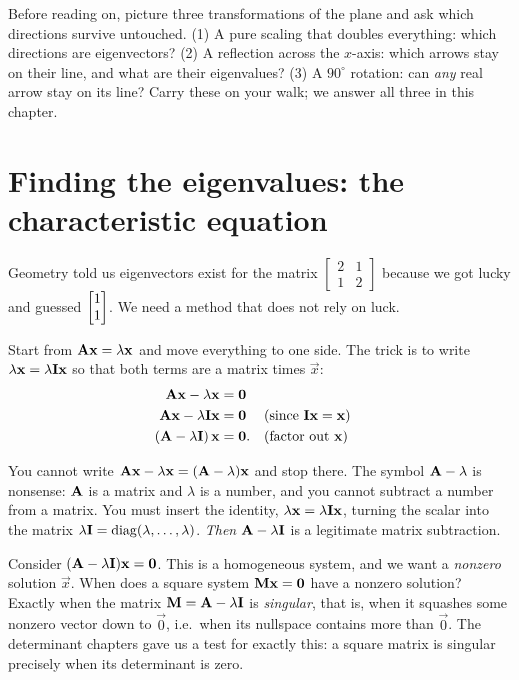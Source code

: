 \begin{walkbox}
Before reading on, picture three transformations of the plane and ask which
directions survive untouched. (1) A pure scaling that doubles everything: which
directions are eigenvectors? (2) A reflection across the $x$-axis: which arrows
stay on their line, and what are their eigenvalues? (3) A $90^\circ$ rotation:
can \emph{any} real arrow stay on its line? Carry these on your walk; we answer
all three in this chapter.
\end{walkbox}

\section{Finding the eigenvalues: the characteristic equation}
\label{ch23:char}

Geometry told us eigenvectors exist for the matrix $\begin{bmatrix}2&1\\1&2\end{bmatrix}$
because we got lucky and guessed $\begin{bmatrix}1\\1\end{bmatrix}$. We need a method that does not
rely on luck.

Start from $\mathbf{A}\mathbf{x}=\lambda\mathbf{x}$ and move everything to one side. The
trick is to write $\lambda\mathbf{x}=\lambda\mathbf{I}\mathbf{x}$ so that both terms are a
matrix times $\vec{x}$:
\begin{align*}
  \mathbf{A}\mathbf{x}-\lambda\mathbf{x}&=\mathbf{0}\\
  \mathbf{A}\mathbf{x}-\lambda\mathbf{I}\mathbf{x}&=\mathbf{0} &&\text{(since $\mathbf{I}\mathbf{x}=\mathbf{x}$)}\\
  (\mathbf{A}-\lambda\mathbf{I})\,\mathbf{x}&=\mathbf{0}. &&\text{(factor out $\mathbf{x}$)}
\end{align*}

\begin{trapbox}
You cannot write $\mathbf{A}\mathbf{x}-\lambda\mathbf{x}=(\mathbf{A}-\lambda)\mathbf{x}$ and stop
there. The symbol $\mathbf{A}-\lambda$ is nonsense: $\mathbf{A}$ is a matrix and
$\lambda$ is a number, and you cannot subtract a number from a matrix. You must
insert the identity, $\lambda\mathbf{x}=\lambda\mathbf{I}\mathbf{x}$, turning the scalar
into the matrix $\lambda\mathbf{I}=\operatorname{diag}(\lambda,\dots,\lambda)$. \emph{Then}
$\mathbf{A}-\lambda\mathbf{I}$ is a legitimate matrix subtraction.
\end{trapbox}

Consider $(\mathbf{A}-\lambda\mathbf{I})\mathbf{x}=\mathbf{0}$. This is a homogeneous
system, and we want a \emph{nonzero} solution $\vec{x}$. When does a square system
$\mathbf{M}\mathbf{x}=\mathbf{0}$ have a nonzero solution? Exactly when the matrix
$\mathbf{M}=\mathbf{A}-\lambda\mathbf{I}$ is \emph{singular}, that is, when it squashes some
nonzero vector down to $\vec{0}$, i.e.\ when its nullspace contains more than
$\vec{0}$. The determinant chapters gave us a test for exactly this: a square
matrix is singular precisely when its determinant is zero.

